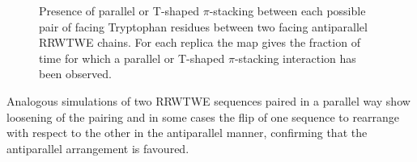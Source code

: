 \begin{figure}[p!]
\centering
{} \hspace{0.2cm}
\caption[$\pi$-stacking interaction in a RRWTWE $\beta$-sheet]{Presence of parallel or T-shaped $\pi$-stacking between each possible pair of facing Tryptophan residues between two facing antiparallel RRWTWE chains. For each replica the map gives the fraction of time for which a parallel or T-shaped $\pi$-stacking interaction has been observed.}
\label{fig:hb_beta_SIhere}
\end{figure}

Analogous simulations of two RRWTWE sequences paired in a parallel way show loosening of the pairing and in some cases the flip of one sequence to rearrange with respect to the other in the antiparallel manner, confirming that the antiparallel arrangement is favoured.


